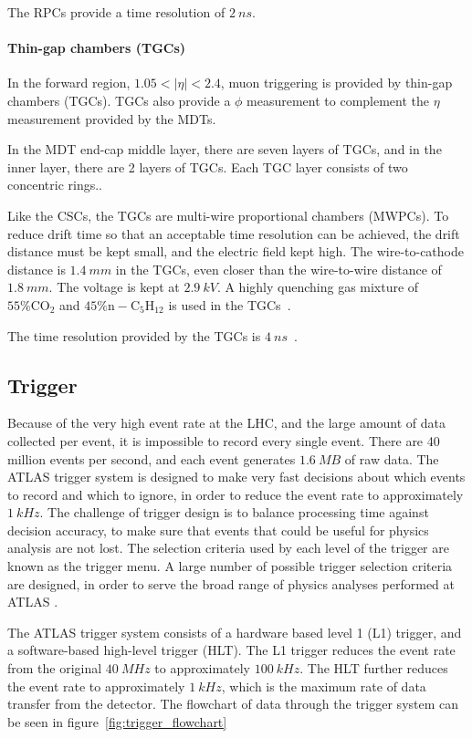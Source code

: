 The RPCs provide a time resolution of $2~ns$.

\paragraph{Thin-gap chambers (TGCs)}

In the forward region, $1.05 < |\eta| < 2.4$, muon triggering is provided by thin-gap chambers (TGCs).
TGCs also provide a $\phi$ measurement to complement the $\eta$ measurement provided by the MDTs.

In the MDT end-cap middle layer, there are seven layers of TGCs, and in the inner layer, there are 2 layers of TGCs.
Each TGC layer consists of two concentric rings..

Like the CSCs, the TGCs are multi-wire proportional chambers (MWPCs).
To reduce drift time so that an acceptable time resolution can be achieved, the drift distance must be kept small,
and the electric field kept high.
The wire-to-cathode distance is $1.4~mm$ in the TGCs, even closer than the wire-to-wire distance of $1.8~mm$.
The voltage is kept at $2.9~kV$.
A highly quenching gas mixture of $55\% \mathrm{CO_2}$ and $45\% \mathrm{n-C_5 H_{12}}$ is used in the TGCs~\cite{atlas-detector-2008}.

The time resolution provided by the TGCs is $4~ns$~\cite{muon-2003}.

\subsection{Trigger}\label{subsec:trigger}

Because of the very high event rate at the LHC, and the large amount of data collected per event,
it is impossible to record every single event.
There are 40 million events per second, and each event generates $1.6~MB$ of raw data.
The ATLAS trigger system is designed to make very fast decisions about which events to record and which to ignore,
in order to reduce the event rate to approximately $1~kHz$.
The challenge of trigger design is to balance processing time against decision accuracy,
to make sure that events that could be useful for physics analysis are not lost.
The selection criteria used by each level of the trigger are known as the trigger menu.
A large number of possible trigger selection criteria are designed, in order to serve the broad range of physics analyses performed at ATLAS .

The ATLAS trigger system consists of a hardware based level 1 (L1) trigger, and a software-based high-level trigger (HLT).
The L1 trigger reduces the event rate from the original $40~MHz$ to approximately $100~kHz$.
The HLT further reduces the event rate to approximately $1~kHz$, which is the maximum rate of data transfer from the detector.
The flowchart of data through the trigger system can be seen in figure~\ref{fig:trigger_flowchart}

